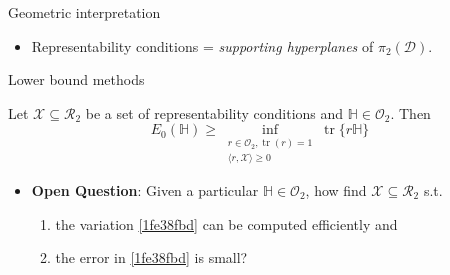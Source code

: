 \documentclass{beamer}
\DeclareMathOperator{\tr}{tr}
\newcommand{\Hamiltonian}{\mathbb{H}}
\newcommand{\DensityMatrices}{\mathcal{D}}
\newcommand{\kbOp}[1][k]{{\ensuremath{\mathcal{O}_{#1}}}}
\newcommand{\PkbOp}[1][k]{{\ensuremath{\pi_{#1}}}}
\begin{document}
\begin{frame}{Geometric interpretation}
  \begin{itemize}
    \item Representability conditions = \emph{supporting hyperplanes} of $\PkbOp[2](\DensityMatrices)$.
  \end{itemize}
  \begin{center}
  \end{center}
\end{frame}

\begin{frame}{Lower bound methods}
  \begin{corollary}
    Let $\mathcal{X}\subseteq\mathcal{R}_2$ be a set of representability conditions and
    $\Hamiltonian\in\kbOp[2]$. Then
    \begin{equation}
      E_0(\Hamiltonian)\ge\inf_{\substack{r\in\kbOp[2],\tr(r)=1\\\langle r,\mathcal{X}\rangle \ge 0}}\tr\{r\Hamiltonian\}
      \label{1fe38fbd}
    \end{equation}
  \end{corollary}
  \begin{itemize}
    \item \textbf{Open Question}: Given a particular $\Hamiltonian\in\kbOp[2]$,
      how find $\mathcal{X}\subseteq\mathcal{R}_2$ s.t.
      \begin{enumerate}
        \item the variation \eqref{1fe38fbd} can be computed efficiently and
        \item the error in \eqref{1fe38fbd} is small?
      \end{enumerate}
  \end{itemize}
\end{frame}
\end{document}
